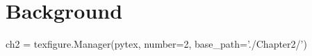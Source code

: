 
\chapter{Background}\label{ch:Background}  %

\begin{pycode}[chapter2]
ch2 = texfigure.Manager(pytex, number=2, base_path='./Chapter2/')
\end{pycode}

%

%
%
%		
%	
	

